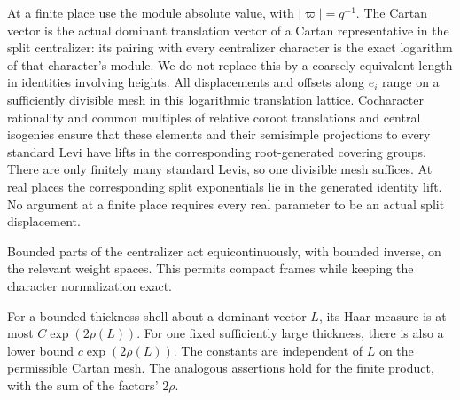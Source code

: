 \begin{convention}
\label{conv:setup-exact-lengths}
At a finite place use the module absolute value, with
$|\varpi|=q^{-1}$.  The Cartan vector is the actual dominant
translation vector of a Cartan representative in the split
centralizer: its pairing with every centralizer character is the
exact logarithm of that character's module.  We do not replace this
by a coarsely equivalent length in identities involving heights.
All displacements and offsets along $e_i$ range on a sufficiently
divisible mesh in this logarithmic translation lattice.  Cocharacter
rationality and common multiples of relative coroot translations
and central isogenies ensure that these elements and their
semisimple projections to every standard Levi have lifts in the
corresponding root-generated covering groups.  There are only finitely
many standard Levis, so one divisible mesh suffices.  At real places
the corresponding split exponentials lie in the generated identity
lift.  No argument at a finite place requires every real
parameter to be an actual split displacement.
\end{convention}

Bounded parts of the centralizer act equicontinuously, with bounded
inverse, on the relevant weight spaces.  This permits compact frames
while keeping the character normalization exact.

\begin{lemma}
\label{lem:setup-haar-shells}
For a bounded-thickness shell about a dominant vector $L$, its Haar
measure is at most $C\exp(2\rho(L))$.  For one fixed sufficiently
large thickness, there is also a lower bound
$c\exp(2\rho(L))$.  The constants are independent of $L$ on the
permissible Cartan mesh.  The analogous assertions hold for the
finite product, with the sum of the factors' $2\rho$.
\end{lemma}

